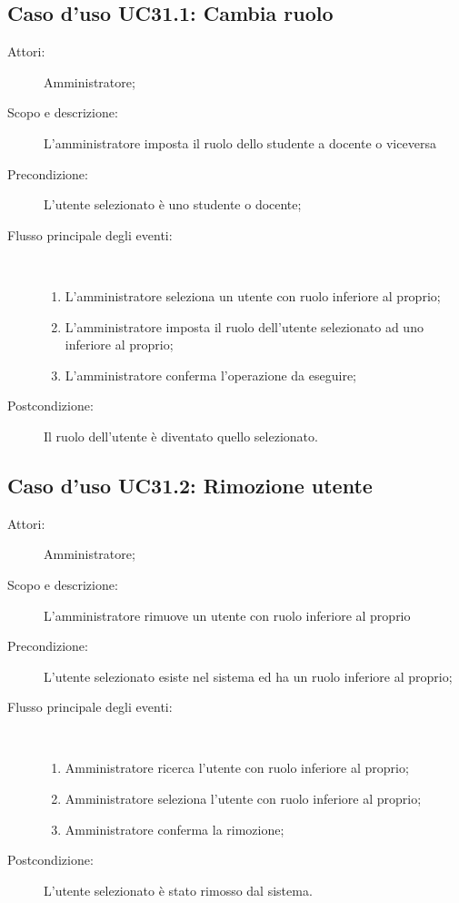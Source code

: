 \subsection{Caso d'uso UC31.1: Cambia ruolo}\begin{description}
\item[Attori:] Amministratore;
\item[Scopo e descrizione:] L'amministratore imposta il ruolo dello studente a docente o viceversa
      \item[Precondizione:] L'utente selezionato è uno studente o docente;

        \item[Flusso principale degli eventi:] \ 
 \begin{enumerate}
          \item L'amministratore seleziona un utente con ruolo inferiore al proprio;
          \item L'amministratore imposta il ruolo dell'utente selezionato ad uno inferiore al proprio;
          \item L'amministratore conferma l'operazione da eseguire;

      \end{enumerate}
    \item[Postcondizione:] Il ruolo dell'utente è diventato quello selezionato.
  \end{description}
\hypertarget{UC31.2}{}
\subsection{Caso d'uso UC31.2: Rimozione utente}\begin{description}
\item[Attori:] Amministratore;
\item[Scopo e descrizione:] L'amministratore rimuove un utente con ruolo inferiore al proprio
      \item[Precondizione:] L'utente selezionato esiste nel sistema ed ha un ruolo inferiore al proprio;

        \item[Flusso principale degli eventi:] \ 
 \begin{enumerate}
          \item Amministratore ricerca l'utente con ruolo inferiore al proprio;
          \item Amministratore seleziona l'utente con ruolo inferiore al proprio;
          \item Amministratore conferma la rimozione;

      \end{enumerate}
    \item[Postcondizione:] L'utente selezionato è stato rimosso dal sistema.
  \end{description}
\hypertarget{UC32}{}
